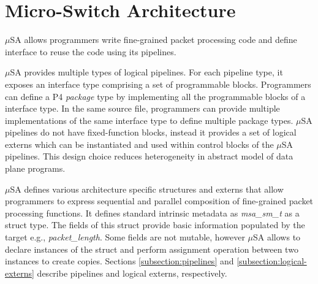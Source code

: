 \section{Micro-Switch Architecture}
\label{section:micros-awitch-architecture}
$\mu$SA allows programmers write fine-grained packet processing code and define interface to reuse the code using its pipelines.

$\mu$SA provides multiple types of logical pipelines.
For each pipeline type, it exposes an interface type comprising a set of programmable blocks.
Programmers can define a P4 \emph{package} type by implementing all the programmable blocks of a interface type.
In the same source file, programmers can provide multiple implementations of the same interface type to define multiple package types.
$\mu$SA pipelines do not have fixed-function blocks, instead it provides a set of logical externs which can be instantiated and used within control blocks of the $\mu$SA pipelines.
This design choice reduces heterogeneity in abstract model of data plane programs.

$\mu$SA defines various architecture specific structures and externs that allow programmers to express sequential and parallel composition of fine-grained packet processing functions.
It defines standard intrinsic metadata as \emph{msa\_sm\_t} as a struct type.
The fields of this struct provide basic information populated by the target e.g., \emph{packet\_length}.
Some fields are not mutable, however $\mu$SA allows to declare instances of the struct and perform assignment operation between two instances to create copies.
Sections \ref{subsection:pipelines} and \ref{subsection:logical-externs} describe pipelines and logical externs, respectively.



